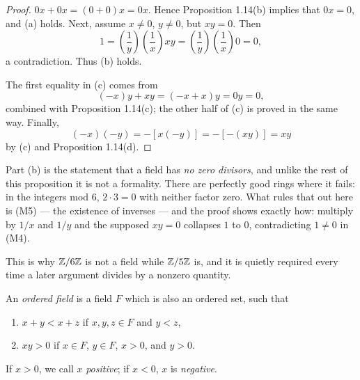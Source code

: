 \begin{proof}
$0x + 0x = (0+0)x = 0x$. Hence Proposition 1.14(b) implies that $0x = 0$, and
(a) holds. Next, assume $x \ne 0$, $y \ne 0$, but
$xy = 0$. Then
\[
  1 = \left(\frac1y\right)\left(\frac1x\right)xy
    = \left(\frac1y\right)\left(\frac1x\right)0 = 0,
\]
a contradiction. Thus (b) holds.

The first equality in (c) comes from
\[ (-x)y + xy = (-x+x)y = 0y = 0, \]
combined with Proposition 1.14(c); the other half of (c) is proved in the same
way. Finally,
\[ (-x)(-y) = -[x(-y)] = -[-(xy)] = xy \]
by (c) and Proposition 1.14(d).
\end{proof}

\begin{deeper}
Part (b) is the statement that a field has \emph{no zero divisors}, and unlike
the rest of this proposition it is not a formality. There are perfectly good
rings where it fails: in the integers mod $6$, $2 \cdot 3 = 0$ with neither
factor zero. What rules that out here is (M5) --- the existence of inverses ---
and the proof shows exactly how: multiply by $1/x$ and $1/y$ and the supposed
$xy = 0$ collapses $1$ to $0$, contradicting $1 \ne 0$ in (M4).

This is why $\mathbb{Z}/6\mathbb{Z}$ is not a field while $\mathbb{Z}/5\mathbb{Z}$ is, and it is quietly
required every time a later argument divides by a nonzero quantity.
\end{deeper}

An \emph{ordered field} is a field $F$ which is also an ordered set, such that
\begin{enumerate}[label=(\roman*), leftmargin=2.2em, itemsep=2pt, topsep=3pt]
  \item $x+y < x+z$ if $x,y,z \in F$ and $y < z$,
  \item $xy > 0$ if $x \in F$, $y \in F$, $x > 0$, and $y > 0$.
\end{enumerate}
If $x > 0$, we call $x$ \emph{positive}; if $x < 0$, $x$ is
\emph{negative}.

